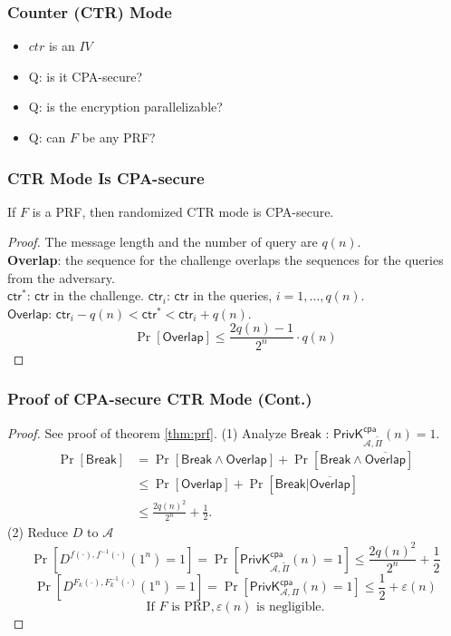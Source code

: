 \begin{frame}\frametitle{Counter (CTR) Mode}
\begin{figure}
\begin{center}

\end{center}
\end{figure}
\begin{itemize}
\item $ctr$ is an $IV$
\item \alert{Q: is it CPA-secure?}
\item \alert{Q: is the encryption parallelizable?}
\item \alert{Q: can $F$ be any PRF?}\end{itemize}
\end{frame}
\begin{frame}\frametitle{CTR Mode Is CPA-secure}
\begin{theorem}
If $F$ is a PRF, then randomized CTR mode is CPA-secure.
\end{theorem}
\begin{proof}
The message length and the number of query are $q(n)$. \\
\textbf{Overlap}: the sequence for the challenge overlaps the sequences for the queries from the adversary.\\
$\mathsf{ctr}^*$: $\mathsf{ctr}$ in the challenge. $\mathsf{ctr}_i$: $\mathsf{ctr}$ in the queries, $i = 1,\dots,q(n)$.\\
$\mathsf{Overlap}$: $\mathsf{ctr}_i-q(n) < \mathsf{ctr}^* < \mathsf{ctr}_i + q(n)$.\\
\[\Pr[\mathsf{Overlap}] \le \frac{2q(n)-1}{2^n} \cdot q(n)\]
\end{proof}
\end{frame}
\begin{frame}\frametitle{Proof of CPA-secure CTR Mode (Cont.)}
\begin{proof}
See proof of theorem \ref{thm:prf}.
(1) Analyze $\mathsf{Break}$ : $\mathsf{PrivK}_{\mathcal{A},\tilde{\Pi}}^{\mathsf{cpa}}(n)=1$.
\[
\begin{split}
	\Pr[\mathsf{Break}] & =\Pr[\mathsf{Break} \land \mathsf{Overlap}] + \Pr[\mathsf{Break} \land \overline{\mathsf{Overlap}}] \\
	&\le \Pr[\mathsf{Overlap}] + \Pr[\mathsf{Break} | \overline{\mathsf{Overlap}}] \\
	&\le \frac{2q(n)^2}{2^n} + \frac{1}{2}.
\end{split}
\]
(2) Reduce $D$ to $\mathcal{A}$
\[ \Pr[D^{f(\cdot),f^{-1}(\cdot)}(1^n)=1]=\Pr[\mathsf{PrivK}_{\mathcal{A},\tilde{\Pi}}^{\mathsf{cpa}}(n)=1] \le \frac{2q(n)^2}{2^n} + \frac{1}{2}
\]
\[\Pr[D^{F_k(\cdot),F_k^{-1}(\cdot)}(1^n)=1]=\Pr[\mathsf{PrivK}_{\mathcal{A},\Pi}^{\mathsf{cpa}}(n)=1] \le \frac{1}{2} + \varepsilon(n)
\]
\[ \text{If } F \text{ is PRP}, \varepsilon(n) \text{ is negligible.}
\]
\end{proof}
\end{frame}
